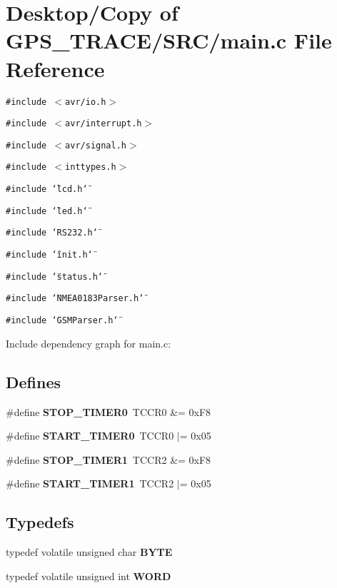 \section{Desktop/Copy of GPS\_\-TRACE/SRC/main.c File Reference}
\label{main_8c}
{\tt \#include $<$avr/io.h$>$}\par
{\tt \#include $<$avr/interrupt.h$>$}\par
{\tt \#include $<$avr/signal.h$>$}\par
{\tt \#include $<$inttypes.h$>$}\par
{\tt \#include \char`\"{}lcd.h\char`\"{}}\par
{\tt \#include \char`\"{}led.h\char`\"{}}\par
{\tt \#include \char`\"{}RS232.h\char`\"{}}\par
{\tt \#include \char`\"{}init.h\char`\"{}}\par
{\tt \#include \char`\"{}status.h\char`\"{}}\par
{\tt \#include \char`\"{}NMEA0183Parser.h\char`\"{}}\par
{\tt \#include \char`\"{}GSMParser.h\char`\"{}}\par


Include dependency graph for main.c:\subsection*{Defines}
\begin{CompactItemize}
\item 
\#define {\bf STOP\_\-TIMER0}~TCCR0 \&= 0xF8
\item 
\#define {\bf START\_\-TIMER0}~TCCR0 $|$= 0x05
\item 
\#define {\bf STOP\_\-TIMER1}~TCCR2 \&= 0xF8
\item 
\#define {\bf START\_\-TIMER1}~TCCR2 $|$= 0x05
\end{CompactItemize}
\subsection*{Typedefs}
\begin{CompactItemize}
\item 
typedef volatile unsigned char {\bf BYTE}
\item 
typedef volatile unsigned int {\bf WORD}
\end{CompactItemize}
